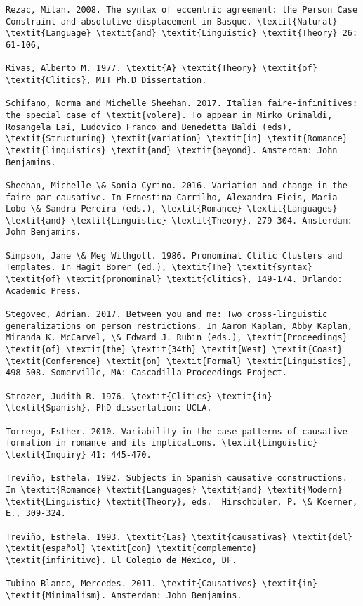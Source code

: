\documentclass[output=paper,modfonts,nonflat]{langsci/langscibook}
\begin{document}
\begin{verbatim}
Rezac, Milan. 2008. The syntax of eccentric agreement: the Person Case Constraint and absolutive displacement in Basque. \textit{Natural} \textit{Language} \textit{and} \textit{Linguistic} \textit{Theory} 26: 61-106,

Rivas, Alberto M. 1977. \textit{A} \textit{Theory} \textit{of} \textit{Clitics}, MIT Ph.D Dissertation.  

Schifano, Norma and Michelle Sheehan. 2017. Italian faire-infinitives: the special case of \textit{volere}. To appear in Mirko Grimaldi, Rosangela Lai, Ludovico Franco and Benedetta Baldi (eds), \textit{Structuring} \textit{variation} \textit{in} \textit{Romance} \textit{linguistics} \textit{and} \textit{beyond}. Amsterdam: John Benjamins.

Sheehan, Michelle \& Sonia Cyrino. 2016. Variation and change in the faire-par causative. In Ernestina Carrilho, Alexandra Fieis, Maria Lobo \& Sandra Pereira (eds.), \textit{Romance} \textit{Languages} \textit{and} \textit{Linguistic} \textit{Theory}, 279-304. Amsterdam: John Benjamins.

Simpson, Jane \& Meg Withgott. 1986. Pronominal Clitic Clusters and Templates. In Hagit Borer (ed.), \textit{The} \textit{syntax} \textit{of} \textit{pronominal} \textit{clitics}, 149-174. Orlando: Academic Press.

Stegovec, Adrian. 2017. Between you and me: Two cross-linguistic generalizations on person restrictions. In Aaron Kaplan, Abby Kaplan, Miranda K. McCarvel, \& Edward J. Rubin (eds.), \textit{Proceedings} \textit{of} \textit{the} \textit{34th} \textit{West} \textit{Coast} \textit{Conference} \textit{on} \textit{Formal} \textit{Linguistics}, 498-508. Somerville, MA: Cascadilla Proceedings Project.

Strozer, Judith R. 1976. \textit{Clitics} \textit{in} \textit{Spanish}, PhD dissertation: UCLA.

Torrego, Esther. 2010. Variability in the case patterns of causative formation in romance and its implications. \textit{Linguistic} \textit{Inquiry} 41: 445-470.

Treviño, Esthela. 1992. Subjects in Spanish causative constructions. In \textit{Romance} \textit{Languages} \textit{and} \textit{Modern} \textit{Linguistic} \textit{Theory}, eds.  Hirschbüler, P. \& Koerner, E., 309-324.

Treviño, Esthela. 1993. \textit{Las} \textit{causativas} \textit{del} \textit{español} \textit{con} \textit{complemento} \textit{infinitivo}. El Colegio de México, DF.

Tubino Blanco, Mercedes. 2011. \textit{Causatives} \textit{in} \textit{Minimalism}. Amsterdam: John Benjamins.


\end{verbatim}
\sloppy\printbibliography[heading=subbibliography,notkeyword=this]
\end{document}

